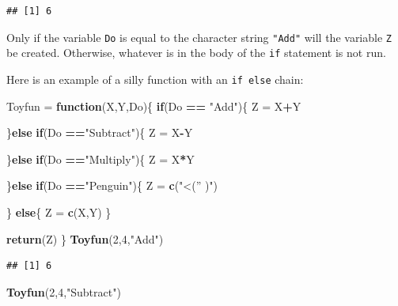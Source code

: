 \documentclass[
]{book}
\newenvironment{Shaded}{\begin{snugshade}}{\end{snugshade}}
\newcommand{\ControlFlowTok}[1]{\textcolor[rgb]{0.13,0.29,0.53}{\textbf{#1}}}
\newcommand{\DecValTok}[1]{\textcolor[rgb]{0.00,0.00,0.81}{#1}}
\newcommand{\KeywordTok}[1]{\textcolor[rgb]{0.13,0.29,0.53}{\textbf{#1}}}
\newcommand{\NormalTok}[1]{#1}
\newcommand{\OperatorTok}[1]{\textcolor[rgb]{0.81,0.36,0.00}{\textbf{#1}}}
\newcommand{\StringTok}[1]{\textcolor[rgb]{0.31,0.60,0.02}{#1}}
\begin{document}
\begin{verbatim}
## [1] 6
\end{verbatim}

Only if the variable \texttt{Do} is equal to the character string \texttt{"Add"} will the variable \texttt{Z} be created. Otherwise, whatever is in the body of the \texttt{if} statement is not run.

Here is an example of a silly function with an \texttt{if\ else} chain:

\begin{Shaded}
\begin{Highlighting}[]
\NormalTok{Toyfun =}\StringTok{ }\ControlFlowTok{function}\NormalTok{(X,Y,Do)\{}
  \ControlFlowTok{if}\NormalTok{(Do }\OperatorTok{==}\StringTok{ "Add"}\NormalTok{)\{}
\NormalTok{    Z =}\StringTok{ }\NormalTok{X}\OperatorTok{+}\NormalTok{Y}

\NormalTok{  \}}\ControlFlowTok{else} \ControlFlowTok{if}\NormalTok{(Do }\OperatorTok{==}\StringTok{"Subtract"}\NormalTok{)\{}
\NormalTok{    Z =}\StringTok{ }\NormalTok{X}\OperatorTok{-}\NormalTok{Y}

\NormalTok{  \}}\ControlFlowTok{else} \ControlFlowTok{if}\NormalTok{(Do }\OperatorTok{==}\StringTok{"Multiply"}\NormalTok{)\{}
\NormalTok{    Z =}\StringTok{ }\NormalTok{X}\OperatorTok{*}\NormalTok{Y}

    
\NormalTok{  \}}\ControlFlowTok{else} \ControlFlowTok{if}\NormalTok{(Do }\OperatorTok{==}\StringTok{"Penguin"}\NormalTok{)\{}
\NormalTok{    Z =}\StringTok{ }\KeywordTok{c}\NormalTok{(}\StringTok{"<('' )"}\NormalTok{)}
    
\NormalTok{  \} }\ControlFlowTok{else}\NormalTok{\{}
\NormalTok{    Z =}\StringTok{ }\KeywordTok{c}\NormalTok{(X,Y)}
\NormalTok{  \}}
  
  \KeywordTok{return}\NormalTok{(Z)}
\NormalTok{\}}
\KeywordTok{Toyfun}\NormalTok{(}\DecValTok{2}\NormalTok{,}\DecValTok{4}\NormalTok{,}\StringTok{"Add"}\NormalTok{)}
\end{Highlighting}
\end{Shaded}

\begin{verbatim}
## [1] 6
\end{verbatim}

\begin{Shaded}
\begin{Highlighting}[]
\KeywordTok{Toyfun}\NormalTok{(}\DecValTok{2}\NormalTok{,}\DecValTok{4}\NormalTok{,}\StringTok{"Subtract"}\NormalTok{)}
\end{Highlighting}
\end{Shaded}
\end{document}

